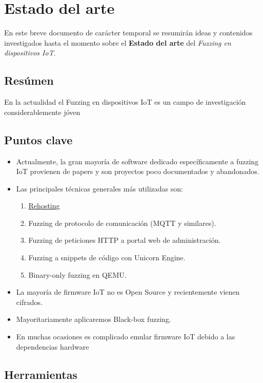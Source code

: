 \documentclass[11pt, a4paper, openany]{report}
\begin{document}
	\chapter{Estado del arte}

    En este breve documento de carácter temporal se resumirán ideas y contenidos investigados 
    hasta el momento sobre el \textbf{Estado del arte} del \textit{Fuzzing en dispositivos IoT}.

    \section{Resúmen}
    En la actualidad el Fuzzing en dispositivos IoT es un campo de investigación considerablemente
    jóven

    \section{Puntos clave}
    \begin{itemize}
        \item Actualmente, la gran mayoría de software dedicado específicamente a fuzzing IoT 
        provienen de papers y son proyectos poco documentados y abandonados.
        \item Las principales técnicas generales más utilizadas son:
        \begin{enumerate}
            \item \href{https://rehosti.ng/}{Rehosting}
            \item Fuzzing de protocolo de comunicación (MQTT y similares).
            \item Fuzzing de peticiones HTTP a portal web de administración.
            \item Fuzzing a snippets de código con Unicorn Engine.
            \item Binary-only fuzzing en QEMU.
        \end{enumerate}
        \item La mayoría de firmware IoT no es Open Source y recientemente vienen cifrados.
        \item Mayoritariamente aplicaremos Black-box fuzzing.
        \item En muchas ocasiones es complicado emular firmware IoT debido a las dependencias
        hardware
    \end{itemize}

    \section{Herramientas}
    
\end{document}
